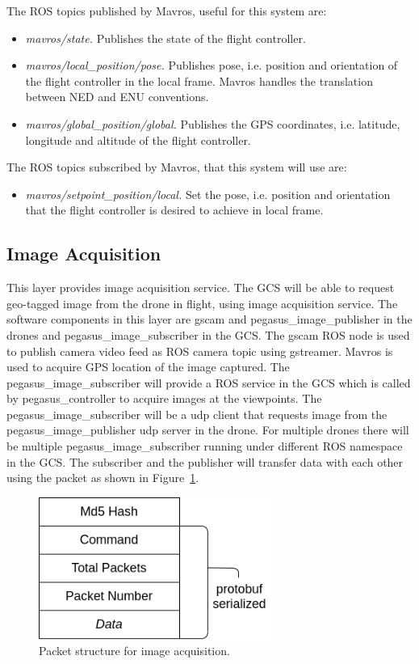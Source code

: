 The ROS topics published by Mavros, useful for this system are:
\begin{itemize}
	\item \textit{mavros/state.} Publishes the state of the flight controller.
	\item \textit{mavros/local\_position/pose.} Publishes pose, i.e. position and orientation of the flight controller in the local frame. Mavros handles the translation between NED and ENU conventions.
	\item \textit{mavros/global\_position/global.} Publishes the GPS coordinates, i.e. latitude, longitude and altitude of the flight controller.
\end{itemize}

The ROS topics subscribed by Mavros, that this system will use are:
\begin{itemize}
	\item \textit{mavros/setpoint\_position/local.} Set the pose, i.e. position and orientation that the flight controller is desired to achieve in local frame.
\end{itemize}


\subsection{Image Acquisition}

This layer provides image acquisition service. The GCS will be able to request geo-tagged image from the drone in flight, using image acquisition service. The software components in this layer are gscam and pegasus\_image\_publisher in the drones and pegasus\_image\_subscriber in the GCS. The gscam ROS node is used to publish camera video feed as ROS camera topic using gstreamer. Mavros is used to acquire GPS location of the image captured. The pegasus\_image\_subscriber will provide a ROS service in the GCS which is called by pegasus\_controller to acquire images at the viewpoints. The pegasus\_image\_subscriber will be a udp client that requests image from the pegasus\_image\_publisher udp server in the drone. For multiple drones there will be multiple pegasus\_image\_subscriber running under different ROS namespace in the GCS. The subscriber and the publisher will transfer data with each other using the packet as shown in Figure~\ref{fig:image-packet}.

\begin{figure}
	\centering
	\caption[Packet structure for image acquisition.]{\small Packet structure for image acquisition.} 
	\label{fig:image-packet}
	\includegraphics[width=3in]{figures/methodology/methodology-Image-packet}
\end{figure}

